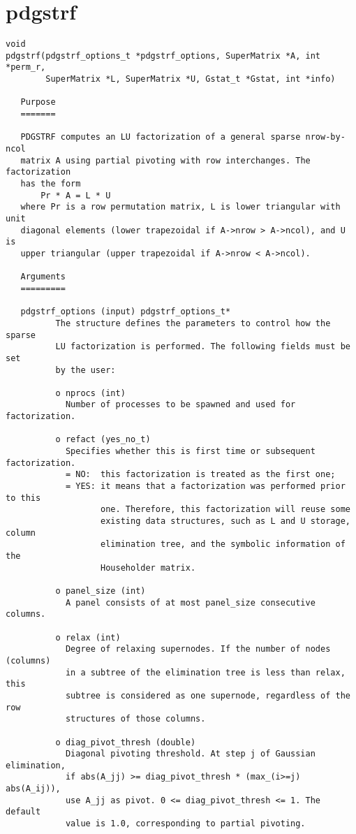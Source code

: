 \section{pdgstrf}
\begin{verbatim}
void
pdgstrf(pdgstrf_options_t *pdgstrf_options, SuperMatrix *A, int *perm_r,
        SuperMatrix *L, SuperMatrix *U,	Gstat_t *Gstat, int *info)

   Purpose
   =======
  
   PDGSTRF computes an LU factorization of a general sparse nrow-by-ncol
   matrix A using partial pivoting with row interchanges. The factorization
   has the form
       Pr * A = L * U
   where Pr is a row permutation matrix, L is lower triangular with unit
   diagonal elements (lower trapezoidal if A->nrow > A->ncol), and U is
   upper triangular (upper trapezoidal if A->nrow < A->ncol).
  
   Arguments
   =========
   
   pdgstrf_options (input) pdgstrf_options_t*
          The structure defines the parameters to control how the sparse
          LU factorization is performed. The following fields must be set 
          by the user:
  
          o nprocs (int)
            Number of processes to be spawned and used for factorization.
  
          o refact (yes_no_t)
            Specifies whether this is first time or subsequent factorization.
            = NO:  this factorization is treated as the first one;
            = YES: it means that a factorization was performed prior to this
                   one. Therefore, this factorization will reuse some
                   existing data structures, such as L and U storage, column
                   elimination tree, and the symbolic information of the
                   Householder matrix.
  
          o panel_size (int)
            A panel consists of at most panel_size consecutive columns.
  
          o relax (int)
            Degree of relaxing supernodes. If the number of nodes (columns)
            in a subtree of the elimination tree is less than relax, this 
            subtree is considered as one supernode, regardless of the row
            structures of those columns.
  
          o diag_pivot_thresh (double)
            Diagonal pivoting threshold. At step j of Gaussian elimination,
            if abs(A_jj) >= diag_pivot_thresh * (max_(i>=j) abs(A_ij)),
            use A_jj as pivot. 0 <= diag_pivot_thresh <= 1. The default
            value is 1.0, corresponding to partial pivoting.
  

\end{verbatim}
